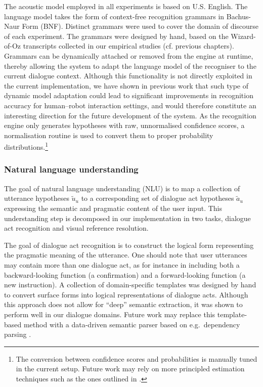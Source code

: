 The acoustic model employed in all experiments is based on U.S. English. The language model takes the form of context-free recognition grammars in Bachus-Naur Form (BNF). Distinct grammars were used to cover the domain of discourse of each experiment. The grammars were designed by hand, based on the Wizard-of-Oz transcripts collected in our empirical studies (cf. previous chapters). Grammars can be dynamically attached or removed from the engine at runtime, thereby allowing the system to adapt the language model of the recogniser to the current dialogue context. Although this functionality is not directly exploited in the current implementation, we have shown in previous work \citep[see][]{ESSLLI2008-springerreprint} that such type of dynamic model adaptation could lead to significant improvements in recognition accuracy for human--robot interaction settings, and would therefore constitute an interesting direction for the future development of the system.  As the recognition engine only generates hypotheses with raw, unnormalised confidence scores, a normalisation routine is used to convert them to proper probability distributions.\footnote{The conversion between confidence scores and probabilities is manually tuned in the current setup.  Future work may rely on more principled estimation techniques such as the ones outlined in \cite{Williams08}.}


\subsubsection*{Natural language understanding}

The goal of natural language understanding (NLU) is to map a collection of utterance hypotheses $\tilde{u}_u$ to a corresponding set of dialogue act hypotheses $\tilde{a}_u$ expressing the semantic and pragmatic content of the user input. This understanding step is decomposed in our implementation in two tasks, dialogue act recognition and visual reference resolution.  

The goal of dialogue act recognition is to construct the logical form representing the pragmatic meaning of the utterance. One should note that user utterances may contain more than one dialogue act, as for instance in  including both a backward-looking function (a confirmation) and a forward-looking function (a new instruction).  A collection of domain-specific templates was designed by hand to convert surface forms into logical representations of dialogue acts.  Although this approach does not allow for ``deep'' semantic extraction, it was shown to perform well in our dialogue domains. Future work may replace this template-based method with a data-driven semantic parser based on e.g.\  dependency parsing \citep{Nivre:Etal07}. 

